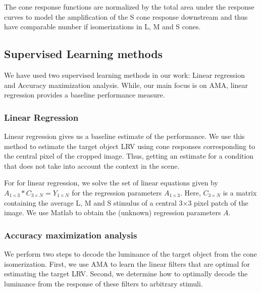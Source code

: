 \documentclass{jov}
\begin{document}

The cone response functions are normalized by the total area under the response curves to model the amplification of the S cone response downstream and thus have comparable number if isomerizations in L, M and S cones. 



\subsection{Supervised Learning methods} \label{method:SupervisedLearning}
We have used two supervised learning methods in our work: Linear regression and Accuracy maximization analysis. While, our main focus is on AMA, linear regression provides a baseline performance measure.

\subsubsection*{Linear Regression} Linear regression gives us a baseline estimate of the performance. We use this method to estimate the target object LRV using cone responses corresponding to the central pixel of the cropped image. Thus, getting an estimate for a condition that does not take into account the context in the scene. 

For for linear regression, we solve the set of linear equations given by $A_{1\times3}*C_{3\times N} = Y_{1\times N}$ for the regression parameters $A_{1\times3}$. Here, $C_{3\times N}$ is a matrix containing the average L, M and S stimulus of a central  3$\times$3 pixel patch of the image. We use Matlab to obtain the (unknown) regression parameters $A$.

\subsubsection*{Accuracy maximization analysis}
We perform two steps to decode the luminance of the target object from the cone isomerization. First, we use AMA to learn the linear filters that are optimal for estimating the target LRV. Second, we determine how to optimally decode the luminance from the response of these filters to arbitrary stimuli.
\end{document}
